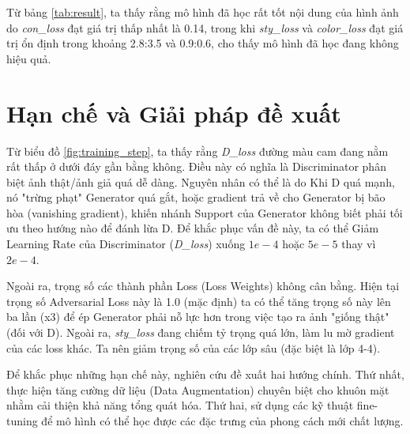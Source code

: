 Từ bảng \ref{tab:result}, ta thấy rằng mô hình đã học rất tốt nội dung của hình ảnh do \textit{con\_loss}
đạt giá trị thấp nhất là 0.14, trong khi \textit{sty\_loss} và \textit{color\_loss} 
đạt giá trị ổn định trong khoảng 2.8:3.5 và 0.9:0.6, cho thấy mô hình đã học đang không hiệu quả.

\section{Hạn chế và Giải pháp đề xuất}

Từ biểu đồ \ref{fig:training_step}, ta thấy rằng \textit{D\_loss} đường màu cam đang nằm rất thấp 
ở dưới đáy gần bằng không. Điều này có nghĩa là Discriminator phân biệt ảnh thật/ảnh giả quá dễ dàng.
Nguyên nhân có thể là do Khi D quá mạnh, nó "trừng phạt" Generator quá gắt, hoặc gradient trả về cho 
Generator bị bão hòa (vanishing gradient), khiến nhánh Support của Generator không biết phải tối ưu 
theo hướng nào để đánh lừa D. Để khắc phục vấn đề này, ta có thể Giảm Learning Rate của 
Discriminator (\textit{D\_loss}) xuống $1e-4$ hoặc $5e-5$ thay vì $2e-4$.

Ngoài ra, trọng số các thành phần Loss (Loss Weights) không cân bằng. Hiện tại trọng số Adversarial Loss này là 1.0 
(mặc định) ta có thể tăng trọng số này lên ba lần (x3) để ép Generator phải nỗ lực hơn trong việc tạo 
ra ảnh "giống thật" (đối với D). Ngoài ra, \textit{sty\_loss} đang chiếm tỷ trọng quá lớn, làm lu mờ 
gradient của các loss khác. Ta nên giảm trọng số của các lớp sâu (đặc biệt là lớp 4-4).

Để khắc phục những hạn chế này, nghiên cứu đề xuất hai hướng chính. Thứ nhất, 
thực hiện tăng cường dữ liệu (Data Augmentation) chuyên biệt cho khuôn mặt nhằm 
cải thiện khả năng tổng quát hóa. Thứ hai, sử dụng các  kỹ thuật fine-tuning để mô hình có thể học được
các đặc trưng của phong cách mới chất lượng.

